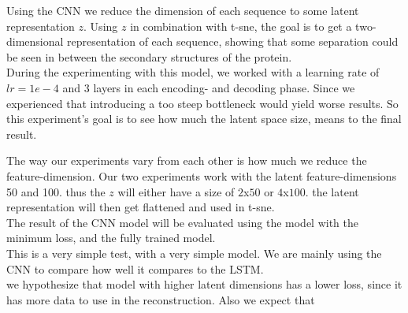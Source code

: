 Using the CNN we reduce the dimension of each sequence to some latent representation $z$. Using $z$ in combination with t-sne, the goal is to get a two-dimensional representation of each sequence, showing that some separation could be seen in between the secondary structures of the protein. \\

\noindent
During the experimenting with this model, we worked with a learning rate of $lr=1e-4$ and 3 layers in each encoding- and decoding phase. Since we experienced that introducing a too steep bottleneck would yield worse results. So this experiment's goal is to see how much the latent space size, means to the final result.

\noindent
The way our experiments vary from each other is how much we reduce the feature-dimension. Our two experiments work with the latent feature-dimensions 50 and 100. thus the $z$ will either have a size of $2$x$50$ or $4$x$100$. the latent representation will then get flattened and used in t-sne. \\

\noindent
The result of the CNN model will be evaluated using the model with the minimum loss, and the fully trained model. \\

\noindent
This is a very simple test, with a very simple model. We are mainly using the CNN to compare how well it compares to the LSTM. \\

\noindent
we hypothesize that model with higher latent dimensions has a lower loss, since it has more data to use in the reconstruction. Also we expect that